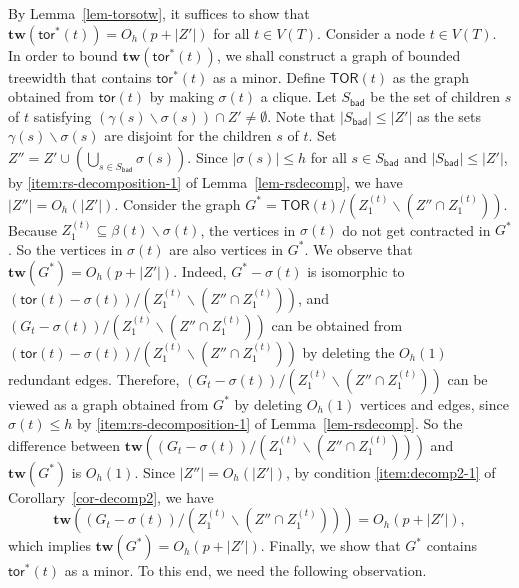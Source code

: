 \documentclass[a4paper,11pt]{article}
\numberwithin{lemma}{section}
\newcommand{\tw}{\mathbf{tw}}
\newcommand{\tor}{\mathsf{tor}}
\begin{document}
By Lemma~\ref{lem-torsotw}, it suffices to show that $\tw(\tor^*(t)) = O_h(p+|Z'|)$ for all $t \in V(T)$.
Consider a node $t \in V(T)$.
In order to bound $\tw(\tor^*(t))$, we shall construct a graph of bounded treewidth that contains $\tor^*(t)$ as a minor.
Define $\mathsf{TOR}(t)$ as the graph obtained from $\tor(t)$ by making $\sigma(t)$ a clique.
Let $S_\mathsf{bad}$ be the set of children $s$ of $t$ satisfying $(\gamma(s) \backslash \sigma(s)) \cap Z' \neq \emptyset$.
Note that $|S_\mathsf{bad}| \leq |Z'|$ as the sets $\gamma(s) \backslash \sigma(s)$ are disjoint for the children $s$ of $t$.
Set $Z'' = Z' \cup (\bigcup_{s \in S_\mathsf{bad}} \sigma(s))$.
Since $|\sigma(s)| \leq h$ for all $s \in S_\mathsf{bad}$ and $|S_\mathsf{bad}| \leq |Z'|$, by \ref{item:rs-decomposition-1} of Lemma~\ref{lem-rsdecomp}, we have $|Z''| = O_h(|Z'|)$.
Consider the graph $G^* = \mathsf{TOR}(t)/(Z_1^{(t)} \backslash (Z'' \cap Z_1^{(t)}))$.
Because $Z_1^{(t)} \subseteq \beta(t) \backslash \sigma(t)$, the vertices in $\sigma(t)$ do not get contracted in $G^*$.
So the vertices in $\sigma(t)$ are also vertices in $G^*$.
We observe that $\tw(G^*) = O_h(p+|Z'|)$.
Indeed, $G^* - \sigma(t)$ is isomorphic to $(\tor(t)-\sigma(t))/(Z_1^{(t)} \backslash (Z'' \cap Z_1^{(t)}))$, and $(G_t - \sigma(t))/(Z_1^{(t)} \backslash (Z'' \cap Z_1^{(t)}))$ can be obtained from $(\tor(t)-\sigma(t))/(Z_1^{(t)} \backslash (Z'' \cap Z_1^{(t)}))$ by deleting the $O_h(1)$ redundant edges.
Therefore, $(G_t - \sigma(t))/(Z_1^{(t)} \backslash (Z'' \cap Z_1^{(t)}))$ can be viewed as a graph obtained from $G^*$ by deleting $O_h(1)$ vertices and edges, since $\sigma(t) \leq h$ by \ref{item:rs-decomposition-1} of Lemma~\ref{lem-rsdecomp}.
So the difference between $\tw((G_t - \sigma(t))/(Z_1^{(t)} \backslash (Z'' \cap Z_1^{(t)})))$ and $\tw(G^*)$ is $O_h(1)$.
Since $|Z''| = O_h(|Z'|)$, by condition \ref{item:decomp2-1} of Corollary~\ref{cor-decomp2}, we have
\begin{equation*}
    \tw((G_t - \sigma(t))/(Z_1^{(t)} \backslash (Z'' \cap Z_1^{(t)}))) = O_h(p+|Z'|),
\end{equation*}
which implies $\tw(G^*) = O_h(p+|Z'|)$.
Finally, we show that $G^*$ contains $\tor^*(t)$ as a minor.
To this end, we need the following observation.
\end{document}

